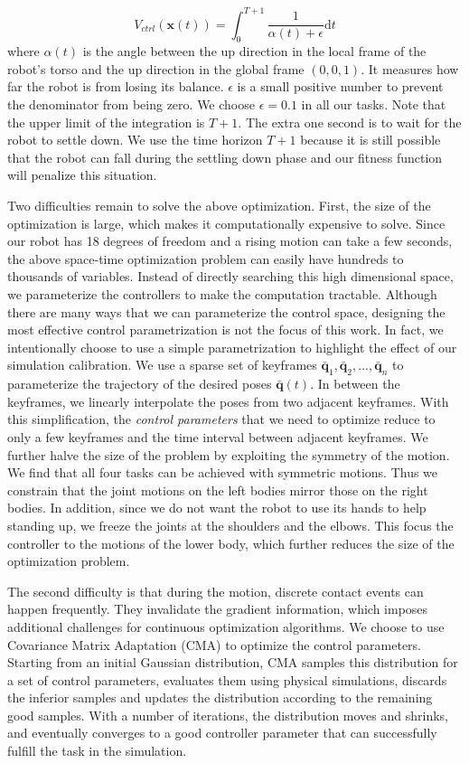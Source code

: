 \begin{equation}
  V_{ctrl}(\mathbf{x}(t))=\int_0^{T+1} \frac{1}{\alpha(t)+\epsilon}\mathrm{d}t
  \label{eqn:controllerObj}
\end{equation}
where $\alpha(t)$ is the angle between the up direction in the local frame of the robot's torso and the up direction in the global frame $(0,0,1)$. It measures how far the robot is from losing its balance. $\epsilon$ is a small positive number to prevent the denominator from being zero. We choose $\epsilon=0.1$ in all our tasks. Note that the upper limit of the integration is $T+1$. The extra one second is to wait for the robot to settle down. We use the time horizon $T+1$ because it is still possible that the robot can fall during the settling down phase and our fitness function will penalize this situation.

Two difficulties remain to solve the above optimization. First, the size of the optimization is large, which makes it computationally expensive to solve. Since our robot has 18 degrees of freedom and a rising motion can take a few seconds, the above space-time optimization problem can easily have hundreds to thousands of variables. Instead of directly searching this high dimensional space, we parameterize the controllers to make the computation tractable. Although there are many ways that we can parameterize the control space, designing the most effective control parametrization is not the focus of this work. In fact, we intentionally choose to use a simple parametrization to highlight the effect of our simulation calibration. We use a sparse set of keyframes $\bar{\mathbf{q}}_1, \bar{\mathbf{q}}_2, ..., \bar{\mathbf{q}}_n$ to parameterize the trajectory of the desired poses $\bar{\mathbf{q}}(t)$. In between the keyframes, we linearly interpolate the poses from two adjacent keyframes. With this simplification, the \emph{control parameters} that we need to optimize reduce to only a few keyframes and the time interval between adjacent keyframes. We further halve the size of the problem by exploiting the symmetry of the motion. We find that all four tasks can be achieved with symmetric motions. Thus we constrain that the joint motions on the left bodies mirror those on the right bodies. In addition, since we do not want the robot to use its hands to help standing up, we freeze the joints at the shoulders and the elbows. This focus the controller to the motions of the lower body, which further reduces the size of the optimization problem.

The second difficulty is that during the motion, discrete contact events can happen frequently. They invalidate the gradient information, which imposes additional challenges for continuous optimization algorithms. We choose to use Covariance Matrix Adaptation (CMA) \cite{Hansen:2009} to optimize the control parameters. Starting from an initial Gaussian distribution, CMA samples this distribution for a set of control parameters, evaluates them using physical simulations, discards the inferior samples and updates the distribution according to the remaining good samples. With a number of iterations, the distribution moves and shrinks, and eventually converges to a good controller parameter that can successfully fulfill the task in the simulation.

